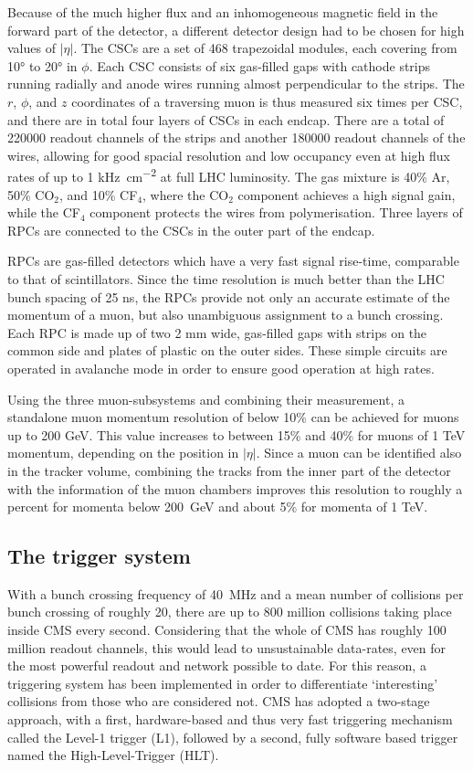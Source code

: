 Because of the much higher flux and an inhomogeneous magnetic field in the forward part of the detector, a different detector design had to be chosen for high values of $|\eta|$.
The CSCs are a set of 468 trapezoidal modules, each covering from \ang{10} to \ang{20} in $\phi$. Each CSC consists of six gas-filled gaps with cathode strips running radially
and anode wires running almost perpendicular to the strips. The $r$, $\phi$, and $z$ coordinates of a traversing muon is thus measured six times per CSC, and there
are in total four layers of CSCs in each endcap. There are a total of \num{220000} readout channels of the strips and another \num{180000} readout channels of the wires,
allowing for good spacial resolution and low occupancy even at high flux rates of up to 1 \si{\kilo\hertz\per\square\centi\meter} at full LHC luminosity. The gas mixture
is 40\% Ar, 50\% CO$_2$, and 10\% CF$_4$, where the CO$_2$ component achieves a high signal gain, while the CF$_4$ component protects the wires from polymerisation. Three
layers of RPCs are connected to the CSCs in the outer part of the endcap.

RPCs are gas-filled detectors which have a very fast signal rise-time, comparable to that of scintillators. Since the time resolution is much better
than the LHC bunch spacing of 25 \si{\nano\second}, the RPCs provide not only an accurate estimate of the momentum of a muon, but also unambiguous
assignment to a bunch crossing. Each RPC is made up of two 2 \si{\milli\meter} wide, gas-filled gaps with strips on the common side and plates of plastic on the outer sides. These 
simple circuits are operated in avalanche mode in order to ensure good operation at high rates.

Using the three muon-subsystems and combining their measurement, a standalone muon momentum resolution of below 10\% can be achieved for muons up to 200 GeV. This value increases
to between 15\% and 40\% for muons of 1 TeV momentum, depending on the position in $|\eta|$. Since a muon can be identified also in the tracker volume, 
combining the tracks from the inner part of the detector with the information of the muon chambers improves this resolution to roughly a percent for momenta below 200~GeV and
about 5\% for momenta of 1 TeV.

\subsection{The trigger system}
\label{sub:cms_trigger}
With a bunch crossing frequency of \SI{40}{\mega\hertz} and a mean number of collisions per bunch crossing of roughly 20, there are up to 800 million collisions taking
place inside CMS every second. Considering that the whole of CMS has roughly 100 million readout channels, this would lead to unsustainable data-rates, even for the most 
powerful readout and network possible to date. For this reason, a triggering system has been implemented in order to differentiate `interesting' collisions from those
who are considered not. CMS has adopted a two-stage approach, with a first, hardware-based and thus very fast triggering mechanism called the Level-1 trigger (L1), followed
by a second, fully software based trigger named the High-Level-Trigger (HLT). 

